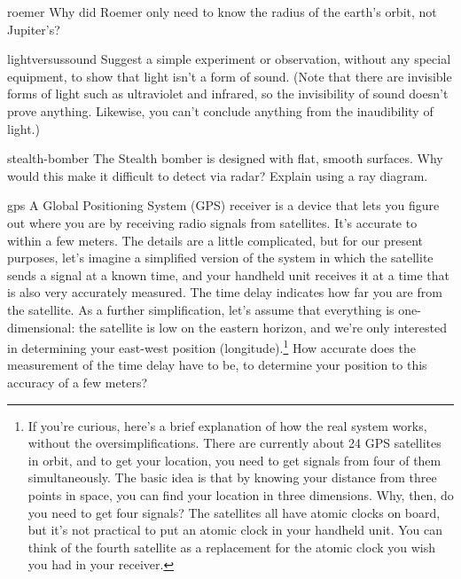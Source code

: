 \begin{hwsection}
\begin{hw}{roemer}
Why did Roemer only need to know the radius of the earth's
orbit, not Jupiter's?
\end{hw}

\begin{hw}{lightversussound}
Suggest a simple experiment or observation, without any special equipment,
to show that light isn't a form of sound. (Note that there are invisible
forms of light such as ultraviolet and infrared, so the invisibility of
sound doesn't prove anything. Likewise, you can't conclude anything from
the inaudibility of light.)
\end{hw}


\begin{hw}{stealth-bomber}
The Stealth bomber is designed with flat, smooth
surfaces. Why would this make it difficult to detect via radar?
Explain using a ray diagram.
\end{hw}

\begin{hw}{gps}
A Global Positioning System (GPS) receiver is a device
that lets you figure out where you are by receiving radio
signals from satellites. It's accurate to within a few
meters. The details are a little complicated,
but for our present purposes, let's imagine a simplified version
of the system in which the satellite sends a signal at a known
time, and your handheld unit receives it at a time that is also
very accurately measured. The time delay indicates how far you
are from the satellite. As a further simplification, let's assume
that everything is one-dimensional: the satellite is low on the
eastern horizon, and we're only interested in determining your
east-west position (longitude).\footnote{If you're curious,
here's a brief explanation of how the real system works, without
the oversimplifications. There are currently about 24 GPS satellites
in orbit, and to get your location, you need to get signals from four
of them simultaneously. The basic idea is that by knowing your distance
from three points in space, you can find your location in three dimensions.
Why, then, do you need to get four signals? The satellites all have atomic
clocks on board, but it's not practical to put an atomic
clock in your handheld unit. You can think of the fourth satellite as
a replacement for the atomic clock you wish you had in your receiver.}
How accurate does the measurement of the time delay
have to be, to determine your position to this accuracy of a few meters?
\end{hw}

\end{hwsection}

